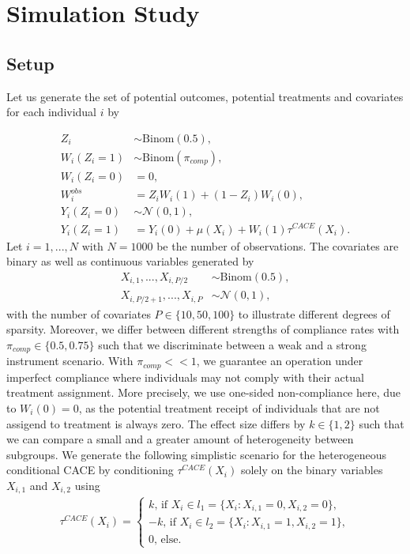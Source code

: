 \chapter{Simulation Study}


\section{Setup}

Let us generate the set of potential outcomes, potential treatments and covariates for each individual $i$ by  

\begin{align*}
    Z_i &\sim \text{Binom}(0.5), \\
    W_i(Z_i=1) &\sim \text{Binom}(\pi_{comp}), \\
    W_i(Z_i=0) &= 0, \\
    W^{obs}_i &= Z_i W_i(1) +  (1-Z_i) W_i(0), \\
    Y_i(Z_i=0) &\sim \mathcal{N}(0, 1), \\
    Y_i(Z_i=1) &= Y_i(0) + \mu(X_i) + W_i(1) \tau^{CACE}(X_i).
\end{align*}
Let $i=1, ..., N \text{ with } N = 1000$ be the number of observations. The covariates are binary as well as continuous variables generated by 
\begin{align*}
    X_{i,1}, ..., X_{i, P/2} &\sim \text{Binom}(0.5), \\
    X_{i, P/2+1}, ..., X_{i, P} &\sim \mathcal{N}(0, 1), 
\end{align*}
with the number of covariates $P \in \{10, 50, 100\}$ to illustrate different degrees of sparsity.
Moreover, we differ between different strengths of compliance rates with $\pi_{comp} \in \{0.5, 0.75\}$ such that we discriminate between a weak and a strong instrument scenario. With $\pi_{comp} << 1$, we guarantee an operation under imperfect compliance where individuals may not comply with their actual treatment assignment. More precisely, we use one-sided non-compliance here, due to $W_i(0)=0$, as the potential treatment receipt of individuals that are not assigend to treatment is always zero. The effect size differs by  $k \in \{1 ,2\}$ such that we can compare a small and a greater amount of heterogeneity between subgroups.
We generate the following simplistic scenario for the heterogeneous conditional CACE by conditioning $\tau^{CACE}(X_i)$ solely on the binary variables $X_{i, 1}$ and $X_{i, 2}$ using 
\begin{align*} 
    \tau^{CACE}(X_i) = \begin{cases*}
        k \text{, if } X_i \in l_1 = \{X_i: X_{i,1}=0, X_{i,2}=0 \}, \\
        -k \text{, if } X_i \in l_2 = \{X_i: X_{i,1}=1, X_{i, 2}=1 \}, \\
        0 \text{, else.}
    \end{cases*}
\end{align*}

